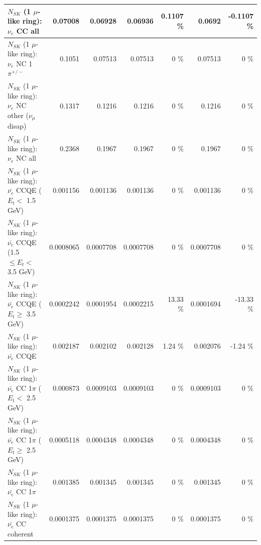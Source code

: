 \begin{table}
\begin{tabular}{| l | r | r | r  r | r  r |}
                                  $N_{SK}$ (1 $\mu$-like ring): $\nu_{e}$ CC all &         0.07008 &         0.06928 &         0.06936 &   0.1107 \%  &          0.0692 &  -0.1107 \%  \\ 
\hline
                           $N_{SK}$ (1 $\mu$-like ring): $\nu_e$ NC 1$\pi^{+/-}$ &          0.1051 &         0.07513 &         0.07513 &        0 \%  &         0.07513 &        0 \%  \\ 
                $N_{SK}$ (1 $\mu$-like ring): $\nu_e$ NC other ($\nu_\mu$ disap) &          0.1317 &          0.1216 &          0.1216 &        0 \%  &          0.1216 &        0 \%  \\ 
                                  $N_{SK}$ (1 $\mu$-like ring): $\nu_{e}$ NC all &          0.2368 &          0.1967 &          0.1967 &        0 \%  &          0.1967 &        0 \%  \\ 
\hline
\hline
\hline
            $N_{SK}$ (1 $\mu$-like ring): $\bar{\nu_e}$ CCQE ($E_{t} <$ 1.5 GeV) &        0.001156 &        0.001136 &        0.001136 &        0 \%  &        0.001136 &        0 \%  \\ 
   $N_{SK}$ (1 $\mu$-like ring): $\bar{\nu_e}$ CCQE (1.5 $\leq E_{t} <$ 3.5 GeV) &       0.0008065 &       0.0007708 &       0.0007708 &        0 \%  &       0.0007708 &        0 \%  \\ 
         $N_{SK}$ (1 $\mu$-like ring): $\bar{\nu_e}$ CCQE ($E_{t} \geq$ 3.5 GeV) &       0.0002242 &       0.0001954 &       0.0002215 &    13.33 \%  &       0.0001694 &   -13.33 \%  \\ 
\hline
                                $N_{SK}$ (1 $\mu$-like ring): $\bar{\nu_e}$ CCQE &        0.002187 &        0.002102 &        0.002128 &     1.24 \%  &        0.002076 &    -1.24 \%  \\ 
\hline
       $N_{SK}$ (1 $\mu$-like ring): $\bar{\nu_e}$ CC 1$\pi$ ($E_{t} <$ 2.5 GeV) &        0.000873 &       0.0009103 &       0.0009103 &        0 \%  &       0.0009103 &        0 \%  \\ 
    $N_{SK}$ (1 $\mu$-like ring): $\bar{\nu_e}$ CC 1$\pi$ ($E_{t} \geq$ 2.5 GeV) &       0.0005118 &       0.0004348 &       0.0004348 &        0 \%  &       0.0004348 &        0 \%  \\ 
\hline
                           $N_{SK}$ (1 $\mu$-like ring): $\bar{\nu_e}$ CC 1$\pi$ &        0.001385 &        0.001345 &        0.001345 &        0 \%  &        0.001345 &        0 \%  \\ 
                         $N_{SK}$ (1 $\mu$-like ring): $\bar{\nu_e}$ CC coherent &       0.0001375 &       0.0001375 &       0.0001375 &        0 \%  &       0.0001375 &        0 \%  \\ 

\end{tabular}
\end{table}
